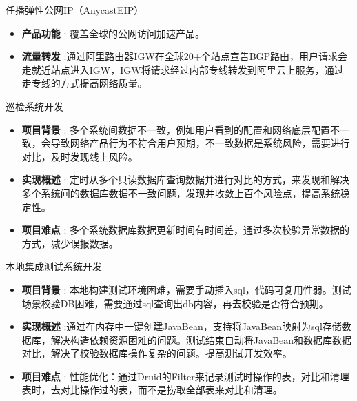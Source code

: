 \documentclass[margin, centered]{res}
\begin{document}
\begin{resume}
        任播弹性公网IP（AnycastEIP）
        \\
        \begin{itemize}[leftmargin=*]


            \item \textbf{{产品功能 }}: 覆盖全球的公网访问加速产品。

            \item \textbf{{流量转发 }}:通过阿里路由器IGW在全球20+个站点宣告BGP路由，用户请求会走就近站点进入IGW，IGW将请求经过内部专线转发到阿里云上服务，通过走专线的方式提高网络质量。

        \end{itemize}


        巡检系统开发
        \\
        \begin{itemize}[leftmargin=*]


            \item \textbf{{项目背景 }}: 多个系统间数据不一致，例如用户看到的配置和网络底层配置不一致，会导致网络产品行为不符合用户预期，不一致数据是系统风险，需要进行对比，及时发现线上风险。

            \item \textbf{{实现概述 }} : 定时从多个只读数据库查询数据并进行对比的方式，来发现和解决多个系统间的数据库数据不一致问题，发现并收敛上百个风险点，提高系统稳定性。

            \item \textbf{{项目难点 }} : 多个系统数据库数据更新时间有时间差，通过多次校验异常数据的方式，减少误报数据。

        \end{itemize}


        本地集成测试系统开发
        \\
        \begin{itemize}[leftmargin=*]


            \item \textbf{{项目背景 }}: 本地构建测试环境困难，需要手动插入sql，代码可复用性弱。测试场景校验DB困难，需要通过sql查询出db内容，再去校验是否符合预期。

            \item \textbf{{实现概述 }} :通过在内存中一键创建JavaBean，支持将JavaBean映射为sql存储数据库，解决构造依赖资源困难的问题。测试结束自动将JavaBean和数据库数据对比，解决了校验数据库操作复杂的问题。提高测试开发效率。

            \item \textbf{{项目难点}} : 性能优化：通过Druid的Filter来记录测试时操作的表，对比和清理表时，去对比操作过的表，而不是捞取全部表来对比和清理。



\end{itemize}
\end{resume}
\end{document}
